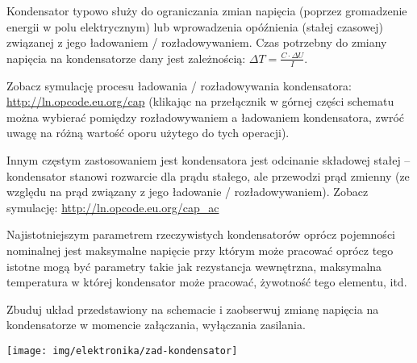 \documentclass{pdfBooklets}
\begin{document}
Kondensator typowo służy do ograniczania zmian napięcia (poprzez gromadzenie energii w polu elektrycznym) lub wprowadzenia opóźnienia (stałej czasowej) związanej z jego ładowaniem / rozładowywaniem.
Czas potrzebny do zmiany napięcia na kondensatorze dany jest zależnością: $\Delta T = \frac{C \cdot \Delta U}{I}$.

Zobacz symulację procesu ładowania / rozładowywania kondensatora: \url{http://ln.opcode.eu.org/cap}
(klikając na przełącznik w górnej części schematu  można wybierać pomiędzy rozładowywaniem a ładowaniem kondensatora, zwróć uwagę na różną wartość oporu użytego do tych operacji).

Innym częstym zastosowaniem jest kondensatora jest odcinanie składowej stałej – kondensator stanowi rozwarcie dla prądu stałego, ale przewodzi prąd zmienny (ze względu na prąd związany z jego ładowanie / rozładowywaniem).
Zobacz symulację: \url{http://ln.opcode.eu.org/cap_ac}

Najistotniejszym parametrem rzeczywistych kondensatorów oprócz pojemności nominalnej jest maksymalne napięcie przy którym może pracować oprócz tego istotne mogą być parametry takie jak rezystancja wewnętrzna, maksymalna temperatura w której kondensator może pracować, żywotność tego elementu, itd.

\begin{Zadanie}{}{}
\noindent\begin{minipage}[b]{0.55\textwidth}
Zbuduj układ przedstawiony na schemacie i zaobserwuj zmianę napięcia na kondensatorze w momencie załączania, wyłączania zasilania.
\vspace{1cm}
\end{minipage}
\hfill
\begin{minipage}[b]{0.4\textwidth}
\texttt{[image: img/elektronika/zad-kondensator]}
\end{minipage}
\end{Zadanie}
\end{document}
